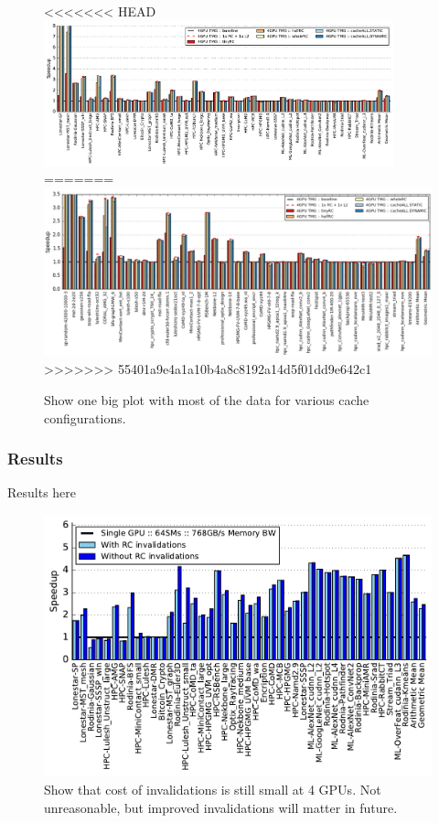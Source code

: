 \begin{figure}[tp]
    \centering
<<<<<<< HEAD
    \includegraphics[width=0.9\textwidth]{figures/plot_remote_cache_WB.pdf}
=======
    \includegraphics[width=1.0\textwidth]{figures/caching.jpg}
>>>>>>> 55401a9e4a1a10b4a8c8192a14d5f01dd9e642c1
    \caption{Show one big plot with most of the data for various cache 
configurations.}
    \label{fig:caching}
\end{figure}


\subsubsection{Results}
Results here

\begin{figure}[t]
    \centering
    \includegraphics[width=1.0\columnwidth]{figures/plot_no_inval_WB.pdf}
    \caption{Show that cost of invalidations is still small at 4 GPUs.  Not 
unreasonable, but improved invalidations will matter in future.}
    \label{fig:invalidations}
\end{figure}

